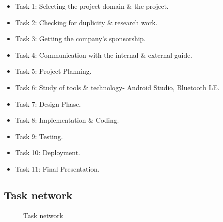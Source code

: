 \documentclass[12pt,a4paper]{report}
\begin{document}
\begin{itemize}
	\item Task 1: Selecting the project domain \& the project.
	\item Task 2: Checking for duplicity \& research work.
	\item Task 3: Getting the company's sponsorship.
	\item Task 4: Communication with the internal \& external guide.
	\item Task 5: Project Planning.
	\item Task 6: Study of tools \& technology- Android Studio, Bluetooth LE.
	\item Task 7: Design Phase.
	\item Task 8: Implementation \& Coding.
	\item Task 9: Testing.
	\item Task 10: Deployment.
	\item Task 11: Final Presentation.
\end{itemize}

\subsection{Task network}
\begin{figure}[!h]
	\begin{center}
		\caption{Task network}
	\end{center}
\end{figure}
\newpage
\end{document}
